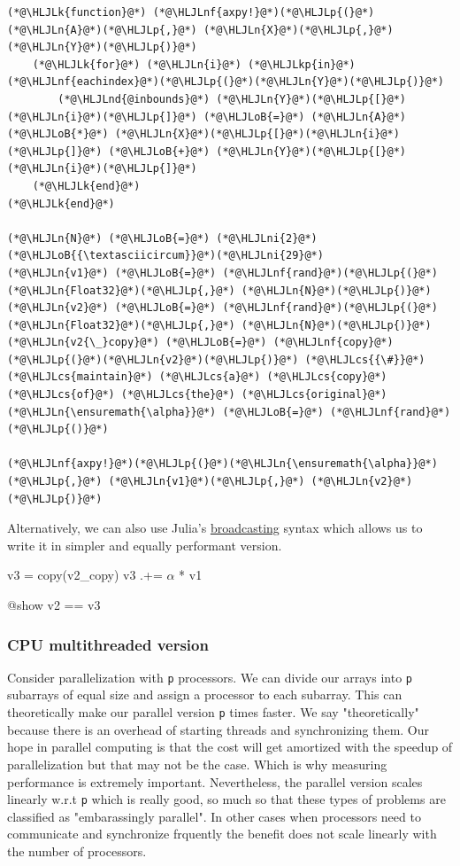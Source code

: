 \documentclass[12pt,a4paper]{article}
\newcommand{\HLJLk}[1]{\textcolor[RGB]{148,91,176}{\textbf{#1}}}
\newcommand{\HLJLkp}[1]{\textcolor[RGB]{148,91,176}{\textbf{#1}}}
\newcommand{\HLJLn}[1]{#1}
\newcommand{\HLJLnd}[1]{\textcolor[RGB]{214,102,97}{#1}}
\newcommand{\HLJLnf}[1]{\textcolor[RGB]{66,102,213}{#1}}
\newcommand{\HLJLni}[1]{\textcolor[RGB]{59,151,46}{#1}}
\newcommand{\HLJLoB}[1]{\textcolor[RGB]{102,102,102}{\textbf{#1}}}
\newcommand{\HLJLp}[1]{#1}
\newcommand{\HLJLcs}[1]{\textcolor[RGB]{153,153,119}{\textit{#1}}}
\begin{document}
\begin{lstlisting}
(*@\HLJLk{function}@*) (*@\HLJLnf{axpy!}@*)(*@\HLJLp{(}@*)(*@\HLJLn{A}@*)(*@\HLJLp{,}@*) (*@\HLJLn{X}@*)(*@\HLJLp{,}@*) (*@\HLJLn{Y}@*)(*@\HLJLp{)}@*) 
    (*@\HLJLk{for}@*) (*@\HLJLn{i}@*) (*@\HLJLkp{in}@*) (*@\HLJLnf{eachindex}@*)(*@\HLJLp{(}@*)(*@\HLJLn{Y}@*)(*@\HLJLp{)}@*)
        (*@\HLJLnd{@inbounds}@*) (*@\HLJLn{Y}@*)(*@\HLJLp{[}@*)(*@\HLJLn{i}@*)(*@\HLJLp{]}@*) (*@\HLJLoB{=}@*) (*@\HLJLn{A}@*) (*@\HLJLoB{*}@*) (*@\HLJLn{X}@*)(*@\HLJLp{[}@*)(*@\HLJLn{i}@*)(*@\HLJLp{]}@*) (*@\HLJLoB{+}@*) (*@\HLJLn{Y}@*)(*@\HLJLp{[}@*)(*@\HLJLn{i}@*)(*@\HLJLp{]}@*)
    (*@\HLJLk{end}@*)
(*@\HLJLk{end}@*)

(*@\HLJLn{N}@*) (*@\HLJLoB{=}@*) (*@\HLJLni{2}@*)(*@\HLJLoB{{\textasciicircum}}@*)(*@\HLJLni{29}@*)
(*@\HLJLn{v1}@*) (*@\HLJLoB{=}@*) (*@\HLJLnf{rand}@*)(*@\HLJLp{(}@*)(*@\HLJLn{Float32}@*)(*@\HLJLp{,}@*) (*@\HLJLn{N}@*)(*@\HLJLp{)}@*)
(*@\HLJLn{v2}@*) (*@\HLJLoB{=}@*) (*@\HLJLnf{rand}@*)(*@\HLJLp{(}@*)(*@\HLJLn{Float32}@*)(*@\HLJLp{,}@*) (*@\HLJLn{N}@*)(*@\HLJLp{)}@*)
(*@\HLJLn{v2{\_}copy}@*) (*@\HLJLoB{=}@*) (*@\HLJLnf{copy}@*)(*@\HLJLp{(}@*)(*@\HLJLn{v2}@*)(*@\HLJLp{)}@*) (*@\HLJLcs{{\#}}@*) (*@\HLJLcs{maintain}@*) (*@\HLJLcs{a}@*) (*@\HLJLcs{copy}@*) (*@\HLJLcs{of}@*) (*@\HLJLcs{the}@*) (*@\HLJLcs{original}@*)
(*@\HLJLn{\ensuremath{\alpha}}@*) (*@\HLJLoB{=}@*) (*@\HLJLnf{rand}@*)(*@\HLJLp{()}@*)

(*@\HLJLnf{axpy!}@*)(*@\HLJLp{(}@*)(*@\HLJLn{\ensuremath{\alpha}}@*)(*@\HLJLp{,}@*) (*@\HLJLn{v1}@*)(*@\HLJLp{,}@*) (*@\HLJLn{v2}@*)(*@\HLJLp{)}@*)
\end{lstlisting}


Alternatively, we can also use Julia's \href{https://docs.julialang.org/en/v1/manual/arrays/#Broadcasting}{broadcasting} syntax which allows us to write it in simpler and equally performant version. 

v3 = copy(v2\_copy) v3 .+= \ensuremath{\alpha} * v1

@show v2 == v3

\subsubsection{CPU multithreaded version}
Consider parallelization with \texttt{p} processors. We can divide our arrays into \texttt{p} subarrays of equal size and assign a processor to each subarray. This can theoretically make our parallel version \texttt{p} times faster. We say "theoretically" because there is an overhead of starting threads and synchronizing them. Our hope in parallel computing is that the cost will get amortized with the speedup of parallelization but that may not be the case. Which is why measuring performance is extremely important. Nevertheless, the parallel version scales linearly w.r.t \texttt{p} which is really good, so much so that these types of problems are classified as "embarassingly parallel". In other cases when processors need to communicate and synchronize frquently the benefit does not scale linearly with the number of processors.
\end{document}
